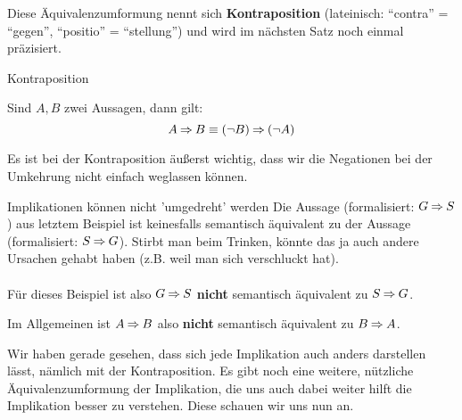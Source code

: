 \documentclass[../../main.tex]{subfiles}
\begin{document}
    Diese Äquivalenzumformung nennt sich \textbf{Kontraposition} (lateinisch: \enquote{contra} = \enquote{gegen}, \enquote{positio} = \enquote{stellung})
    und wird im nächsten Satz noch einmal präzisiert.
    
    \begin{theorem}{Kontraposition}

    Sind $A,B$ zwei Aussagen, dann gilt:
        \[A \mathbin{\Rightarrow} B  \equiv (\lnot B) \mathbin{\Rightarrow} (\lnot A)\]
    \end{theorem}

    Es ist bei der Kontraposition äußerst wichtig, dass wir die Negationen bei der Umkehrung
    nicht einfach weglassen können. 

    \begin{example}{Implikationen können nicht 'umgedreht' werden}
        Die Aussage  (formalisiert: $G \mathbin{\Rightarrow} S$) aus letztem Beispiel ist 
        keinesfalls semantisch äquivalent zu der 
        Aussage  (formalisiert: $S \mathbin{\Rightarrow} G$).
        Stirbt man beim Trinken, könnte das ja auch andere Ursachen gehabt haben (z.B. weil man sich verschluckt hat).
        \\ \\
        Für dieses Beispiel ist also $G \mathbin{\Rightarrow} S$ \textbf{nicht} semantisch äquivalent zu $S \mathbin{\Rightarrow} G$.

    \end{example}

    Im Allgemeinen ist $A \mathbin{\Rightarrow} B$ also \textbf{nicht} semantisch äquivalent zu $B \mathbin{\Rightarrow} A$.

    Wir haben gerade gesehen, dass sich jede Implikation auch anders darstellen lässt, 
    nämlich mit der Kontraposition. Es gibt noch eine weitere, nützliche Äquivalenzumformung 
    der Implikation, die uns auch dabei weiter hilft die Implikation besser zu verstehen.
    Diese schauen wir uns nun an.
    
\end{document}
